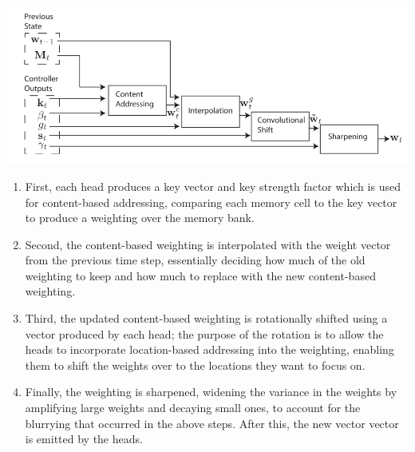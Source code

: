 \documentclass{article}
\begin{document}
\begin{center}
    \includegraphics[scale=0.4]{images/weight_emission.png}
\end{center}

\begin{enumerate}
    \item First, each head produces a key vector and key strength factor which is used for content-based addressing, comparing each memory cell to the key vector to produce a weighting over the memory bank.
    \item Second, the content-based weighting is interpolated with the weight vector from the previous time step, essentially deciding how much of the old weighting to keep and how much to replace with the new content-based weighting.
    \item Third, the updated content-based weighting is rotationally shifted using a vector produced by each head; the purpose of the rotation is to allow the heads to incorporate location-based addressing into the weighting, enabling them to shift the weights over to the locations they want to focus on.
    \item Finally, the weighting is sharpened, widening the variance in the weights by amplifying large weights and decaying small ones, to account for the blurrying that occurred in the above steps. After this, the new vector vector is emitted by the heads.
\end{enumerate}
\end{document}
